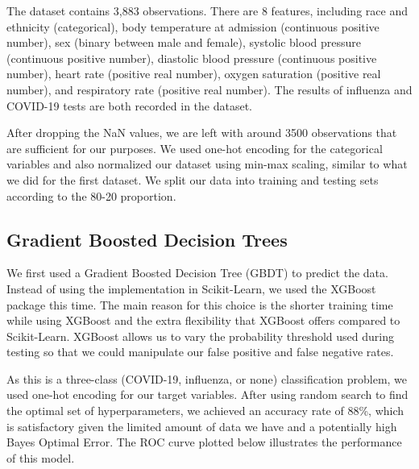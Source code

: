 \documentclass[a4paper, 11pt]{article}
\begin{document}
The dataset contains 3,883 observations. There are 8 features, including race and ethnicity (categorical), body temperature at admission (continuous positive number), sex (binary between male and female), systolic blood pressure (continuous positive number), diastolic blood pressure (continuous positive number), heart rate (positive real number), oxygen saturation (positive real number), and respiratory rate (positive real number). The results of influenza and COVID-19 tests are both recorded in the dataset. \par
After dropping the NaN values, we are left with around 3500 observations that are sufficient for our purposes. We used one-hot encoding for the categorical variables and also normalized our dataset using min-max scaling, similar to what we did for the first dataset. We split our data into training and testing sets according to the 80-20 proportion.\par


\subsection*{Gradient Boosted Decision Trees}

We first used a Gradient Boosted Decision Tree (GBDT) to predict the data. Instead of using the implementation in Scikit-Learn, we used the XGBoost package this time. The main reason for this choice is the shorter training time while using XGBoost and the extra flexibility that XGBoost offers compared to Scikit-Learn. XGBoost allows us to vary the probability threshold used during testing so that we could manipulate our false positive and false negative rates. \par 
As this is a three-class (COVID-19, influenza, or none) classification problem, we used one-hot encoding for our target variables. After using random search to find the optimal set of hyperparameters, we achieved an accuracy rate of 88\%, which is satisfactory given the limited amount of data we have and a potentially high Bayes Optimal Error. The ROC curve plotted below illustrates the performance of this model.
\end{document}
